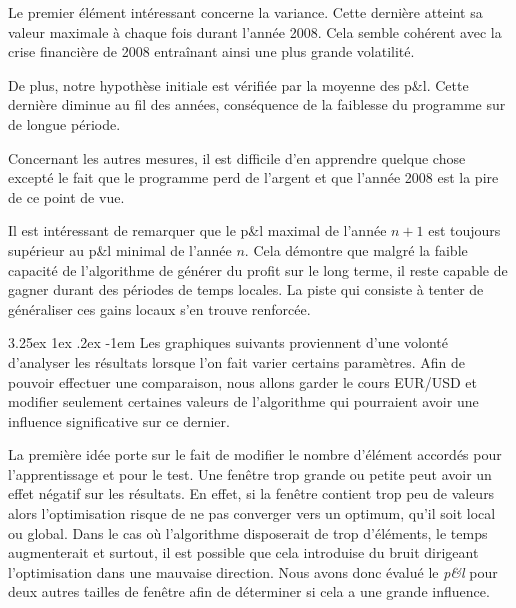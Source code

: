 \documentclass[a4paper, 11pt]{article}
\makeatletter
\renewcommand\paragraph{\@startsection{paragraph}{5}{\z@}%
  {3.25ex \@plus1ex \@minus.2ex}%
  {-1em}%
  {\normalfont\normalsize\bfseries}}
\makeatother
\begin{document}
Le premier élément intéressant concerne la variance. Cette dernière atteint sa valeur maximale à chaque fois durant l'année 2008. Cela semble cohérent avec la crise financière de 2008 entraînant ainsi une plus grande volatilité.

De plus, notre hypothèse initiale est vérifiée par la moyenne des p\&l. Cette dernière diminue au fil des années, conséquence de la faiblesse du programme sur de longue période.

Concernant les autres mesures, il est difficile d'en apprendre quelque chose excepté le fait que le programme perd de l'argent et que l'année 2008 est la pire de ce point de vue.

Il est intéressant de remarquer que le p\&l maximal de l'année $n+1$ est toujours supérieur au p\&l minimal de l'année $n$. Cela démontre que malgré la faible capacité de l'algorithme de générer du profit sur le long terme, il reste capable de gagner durant des périodes de temps locales. La piste qui consiste à tenter de généraliser ces gains locaux s'en trouve renforcée.

\paragraph{}
Les graphiques suivants proviennent d'une volonté d'analyser les résultats lorsque l'on fait varier certains paramètres. Afin de pouvoir effectuer une comparaison, nous allons garder le cours EUR/USD et modifier seulement certaines valeurs de l'algorithme qui pourraient avoir une influence significative sur ce dernier.

La première idée porte sur le fait de modifier le nombre d'élément accordés pour l'apprentissage et pour le test. Une fenêtre trop grande ou petite peut avoir un effet négatif sur les résultats. En effet, si la fenêtre contient trop peu de valeurs alors l'optimisation risque de ne pas converger vers un optimum, qu'il soit local ou global. Dans le cas où l'algorithme disposerait de trop d'éléments, le temps augmenterait et surtout, il est possible que cela introduise du bruit dirigeant l'optimisation dans une mauvaise direction. Nous avons donc évalué le \textit{p\&l} pour deux autres tailles de fenêtre afin de déterminer si cela a une grande influence.
\end{document}
